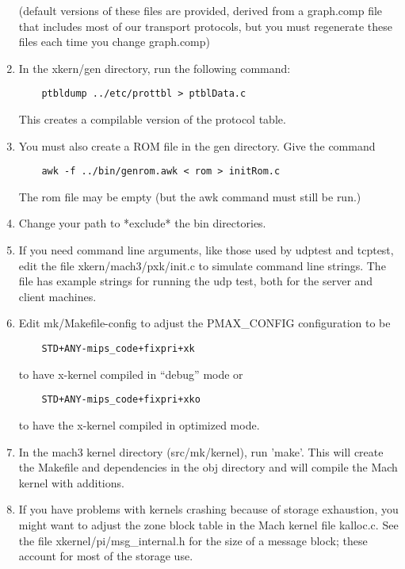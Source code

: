 \begin{enumerate}
   (default versions of these files are provided, derived from a graph.comp
    file that includes most of our transport protocols, but you must
    regenerate these files each time you change graph.comp)

\item In the xkern/gen directory, run the following command:
\begin{verbatim}
	ptbldump ../etc/prottbl > ptblData.c
\end{verbatim}
   This creates a compilable version of the protocol table.

\item You must also create a ROM file in the gen directory.
    Give the command 
\begin{verbatim}
	awk -f ../bin/genrom.awk < rom > initRom.c
\end{verbatim}
    The rom file may be empty (but the awk command must still be run.)

\item Change your path to *exclude* the \xk{} bin directories.


\item If you need command line arguments, like those used by udptest and tcptest,
   edit the file xkern/mach3/pxk/init.c to simulate command line strings.
   The file has example strings for running the udp test, both for
   the server and client machines.


\item Edit mk/Makefile-config to adjust the PMAX\_CONFIG configuration to
    be 
\begin{verbatim}
	STD+ANY-mips_code+fixpri+xk
\end{verbatim}

    to have x-kernel compiled in ``debug'' mode or 
\begin{verbatim}
	STD+ANY-mips_code+fixpri+xko
\end{verbatim}
    to have the x-kernel compiled in optimized mode.


\item In the mach3 kernel directory (src/mk/kernel), run 'make'.
This will create the Makefile and dependencies in the obj directory and
will compile the Mach kernel with \xk{} additions.


\item If you have problems with kernels crashing because of storage exhaustion,
   you might want to adjust the zone block table in the Mach kernel file
   kalloc.c.  See the \xk{} file xkernel/pi/msg\_internal.h for the
   size of a message block; these account for most of the \xk{} storage use.



\end{enumerate}
